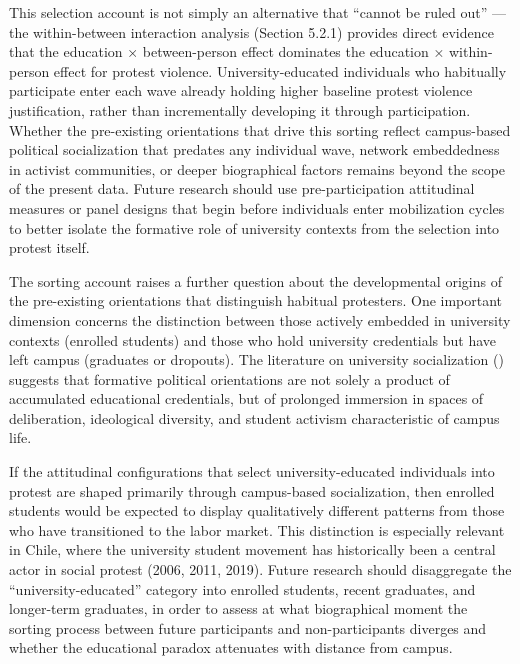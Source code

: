 \documentclass[
  13pt,
]{article}
\begin{document}
This selection account is not simply an alternative that ``cannot be
ruled out'' --- the within-between interaction analysis (Section 5.2.1)
provides direct evidence that the education × between-person effect
dominates the education × within-person effect for protest violence.
University-educated individuals who habitually participate enter each
wave already holding higher baseline protest violence justification,
rather than incrementally developing it through participation. Whether
the pre-existing orientations that drive this sorting reflect
campus-based political socialization that predates any individual wave,
network embeddedness in activist communities, or deeper biographical
factors remains beyond the scope of the present data. Future research
should use pre-participation attitudinal measures or panel designs that
begin before individuals enter mobilization cycles to better isolate the
formative role of university contexts from the selection into protest
itself.

The sorting account raises a further question about the developmental
origins of the pre-existing orientations that distinguish habitual
protesters. One important dimension concerns the distinction between
those actively embedded in university contexts (enrolled students) and
those who hold university credentials but have left campus (graduates or
dropouts). The literature on university socialization
() suggests that
formative political orientations are not solely a product of accumulated
educational credentials, but of prolonged immersion in spaces of
deliberation, ideological diversity, and student activism characteristic
of campus life.

If the attitudinal configurations that select university-educated
individuals into protest are shaped primarily through campus-based
socialization, then enrolled students would be expected to display
qualitatively different patterns from those who have transitioned to the
labor market. This distinction is especially relevant in Chile, where
the university student movement has historically been a central actor in
social protest (2006, 2011, 2019). Future research should disaggregate
the ``university-educated'' category into enrolled students, recent
graduates, and longer-term graduates, in order to assess at what
biographical moment the sorting process between future participants and
non-participants diverges and whether the educational paradox attenuates
with distance from campus.
\end{document}

